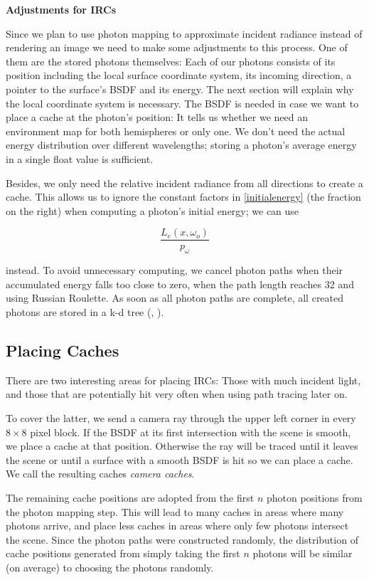 \textbf{Adjustments for IRCs}

Since we plan to use photon mapping to approximate incident radiance instead of rendering an image we need to make some adjustments to this process. One of them are the stored photons themselves: Each of our photons consists of its position including the local surface coordinate system, its incoming direction, a pointer to the surface's BSDF and its energy. The next section will explain why the local coordinate system is necessary. The BSDF is needed in case we want to place a cache at the photon's position: It tells us whether we need an environment map for both hemispheres or only one. We don't need the actual energy distribution over different wavelengths; storing a photon's average energy in a single float value is sufficient.

Besides, we only need the relative incident radiance from all directions to create a cache. This allows us to ignore the constant factors in \ref{initialenergy} (the fraction on the right) when computing a photon's initial energy; we can use 

\begin{equation}
\frac{L_e(x,\omega_o)}{p_{\omega}}
\end{equation}
 
 instead. To avoid unnecessary computing, we cancel photon paths when their accumulated energy falls too close to zero, when the path length reaches 32 and using Russian Roulette. As soon as all photon paths are complete, all created photons are stored in a k-d tree (\cite{kdref1}, \cite{nanoflann}).


\newpage

\subsection{Placing Caches}
\label{placing caches}
There are two interesting areas for placing IRCs: Those with much incident light, and those that are potentially hit very often when using path tracing later on.

To cover the latter, we send a camera ray through the upper left corner in every $8\times 8$ pixel block. If the BSDF at its first intersection with the scene is smooth, we place a cache at that position. Otherwise the ray will be traced until it leaves the scene or until a surface with a smooth BSDF is hit so we can place a cache. We call the resulting caches \emph{camera caches}.

The remaining cache positions are adopted from the first $n$ photon positions from the photon mapping step. This will lead to many caches in areas where many photons arrive, and place less caches in areas where only few photons intersect the scene.  Since the photon paths were constructed randomly,  the distribution of cache positions generated from simply taking the first $n$ photons will  be similar (on average) to choosing the photons randomly.

